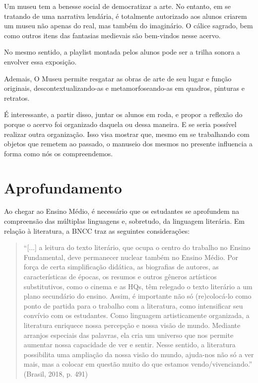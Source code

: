 \documentclass[12pt]{extarticle}
\begin{document}
Um museu tem a benesse social de democratizar a arte. No entanto, em se
tratando de uma narrativa lendária, é totalmente autorizado aos alunos
criarem um museu não apenas do real, mas também do imaginário. O cálice
sagrado, bem como outros itens das fantasias medievais são bem-vindos
nesse acervo.

No mesmo sentido, a playlist montada pelos alunos pode ser a trilha
sonora a envolver essa exposição.

Ademais, O Museu permite resgatar as obras de arte de seu lugar e função
originais, descontextualizando-as e metamorfoseando-as em quadros,
pinturas e retratos.

É interessante, a partir disso, juntar os alunos em roda, e propor a
reflexão do porque o acervo foi organizado daquela ou dessa maneira. E
se seria possível realizar outra organização. Isso visa mostrar que,
mesmo em se trabalhando com objetos que remetem ao passado, o manuseio
dos mesmos no presente influencia a forma como nós os compreendemos.



\section{Aprofundamento}

Ao chegar ao Ensino Médio, é necessário que os estudantes se aprofundem
na compreensão das múltiplas linguagens e, sobretudo, da linguagem
literária. Em relação à literatura, a BNCC traz as seguintes
considerações:

\begin{quote}
``{[}...{]} a leitura do texto literário, que ocupa o centro do trabalho
no Ensino Fundamental, deve permanecer nuclear também no Ensino Médio.
Por força de certa simplificação didática, as biografias de autores, as
características de épocas, os resumos e outros gêneros artísticos
substitutivos, como o cinema e as HQs, têm relegado o texto literário a
um plano secundário do ensino. Assim, é importante não só (re)colocá-lo
como ponto de partida para o trabalho com a literatura, como
intensificar seu convívio com os estudantes. Como linguagem
artisticamente organizada, a literatura enriquece nossa percepção e
nossa visão de mundo. Mediante arranjos especiais das palavras, ela cria
um universo que nos permite aumentar nossa capacidade de ver e sentir.
Nesse sentido, a literatura possibilita uma ampliação da nossa visão do
mundo, ajuda-nos não só a ver mais, mas a colocar em questão muito do
que estamos vendo/vivenciando.'' (Brasil, 2018, p. 491)
\end{quote}
\end{document}
